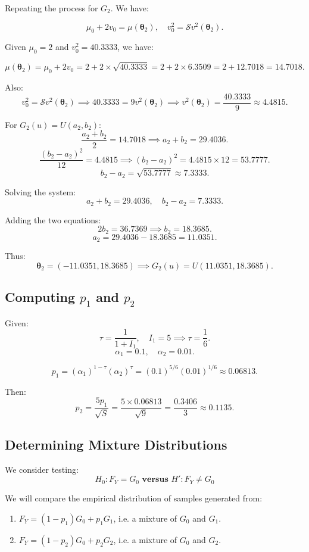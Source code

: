 \documentclass{article}
\begin{document}
Repeating the process for \(G_2\). We have:

\[
\mu_0 + 2v_0 = \mu(\boldsymbol\theta_2), \quad v_0^2 = \mathcal{S} v^2(\boldsymbol\theta_2).
\]

Given \(\mu_0 = 2\) and \(v_0^2 = 40.3333\), we have:

\[
\mu(\boldsymbol\theta_2) = \mu_0 + 2v_0 = 2 + 2 \times \sqrt{40.3333} = 2 + 2 \times 6.3509 = 2 + 12.7018 = 14.7018.
\]

Also:
\[
v_0^2 = \mathcal{S} v^2(\boldsymbol\theta_2) \implies 40.3333 = 9 v^2(\boldsymbol\theta_2) \implies v^2(\boldsymbol\theta_2) = \frac{40.3333}{9} \approx 4.4815.
\]

For \(G_2(u) = U(a_2, b_2)\):
\[
\frac{a_2 + b_2}{2} = 14.7018 \implies a_2 + b_2 = 29.4036.
\]
\[
\frac{(b_2 - a_2)^2}{12} = 4.4815 \implies (b_2 - a_2)^2 = 4.4815 \times 12 = 53.7777.
\]
\[
b_2 - a_2 = \sqrt{53.7777} \approx 7.3333.
\]

Solving the system:
\[
a_2 + b_2 = 29.4036, \quad b_2 - a_2 = 7.3333.
\]

Adding the two equations:
\[
2b_2 = 36.7369 \implies b_2 = 18.3685.
\]
\[
a_2 = 29.4036 - 18.3685 = 11.0351.
\]

Thus:
\[
\boldsymbol\theta_2 = (-11.0351, 18.3685) \implies G_2(u) = U(11.0351, 18.3685).
\]

\subsection{Computing \( p_1 \) and \( p_2 \)}

Given:
\[
\tau = \frac{1}{1+I_1}, \quad I_1 = 5 \implies \tau = \frac{1}{6}.
\]
\[
\alpha_1 = 0.1, \quad \alpha_2 = 0.01.
\]

\[
p_1 = (\alpha_1)^{1-\tau} (\alpha_2)^\tau = (0.1)^{5/6} (0.01)^{1/6} \approx 0.06813.
\]

Then:
\[
p_2 = \frac{5 p_1}{\sqrt{S}} = \frac{5 \times 0.06813}{\sqrt{9}} = \frac{0.3406}{3} \approx 0.1135.
\]

\subsection{Determining Mixture Distributions}

We consider testing:
\[
H_0: F_Y = G_0 \textbf{ versus } H': F_Y \neq G_0
\]

We will compare the empirical distribution of samples generated from:

\begin{enumerate}
    \item \(F_Y = (1-p_1)G_0 + p_1 G_1\), i.e. a mixture of \(G_0\) and \(G_1\).
    \item \(F_Y = (1-p_2)G_0 + p_2 G_2\), i.e. a mixture of \(G_0\) and \(G_2\).
\end{enumerate}
\end{document}
